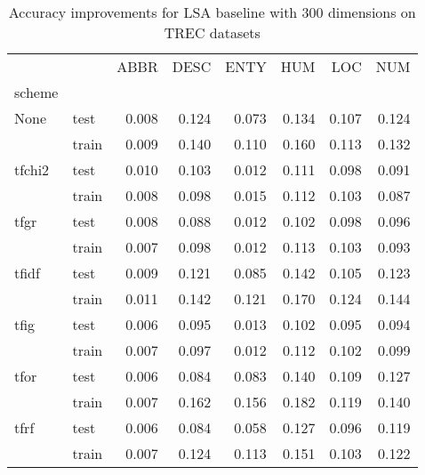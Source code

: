 \begin{table}[h]
\begin{center}

\begin{tabular}{llrrrrrr}
\toprule
{} &  &  ABBR &  DESC &  ENTY &  HUM &  LOC &  NUM \\
scheme &  &       &       &       &      &      &      \\
\midrule
None & test &     0.008 &     0.124 &     0.073 &    0.134 &    0.107 &    0.124 \\
{} & train &     0.009 &     0.140 &     0.110 &    0.160 &    0.113 &    0.132 \\
tfchi2 & test &     0.010 &     0.103 &     0.012 &    0.111 &    0.098 &    0.091 \\
{} & train &     0.008 &     0.098 &     0.015 &    0.112 &    0.103 &    0.087 \\
tfgr & test &     0.008 &     0.088 &     0.012 &    0.102 &    0.098 &    0.096 \\
{} & train &     0.007 &     0.098 &     0.012 &    0.113 &    0.103 &    0.093 \\
tfidf & test &     0.009 &     0.121 &     0.085 &    0.142 &    0.105 &    0.123 \\
{} & train &     0.011 &     0.142 &     0.121 &    0.170 &    0.124 &    0.144 \\
tfig & test &     0.006 &     0.095 &     0.013 &    0.102 &    0.095 &    0.094 \\
{} & train &     0.007 &     0.097 &     0.012 &    0.112 &    0.102 &    0.099 \\
tfor & test &     0.006 &     0.084 &     0.083 &    0.140 &    0.109 &    0.127 \\
{} & train &     0.007 &     0.162 &     0.156 &    0.182 &    0.119 &    0.140 \\
tfrf & test &     0.006 &     0.084 &     0.058 &    0.127 &    0.096 &    0.119 \\
{} & train &     0.007 &     0.124 &     0.113 &    0.151 &    0.103 &    0.122 \\
\bottomrule
\end{tabular}

\caption[Accuracy improvements for LSA baseline with 300 dimensions on TREC datasets]{Accuracy improvements for LSA baseline with 300 dimensions on TREC datasets}
\label{tab:lsa:resuts:300:TREC}
\end{center}
\end{table}





